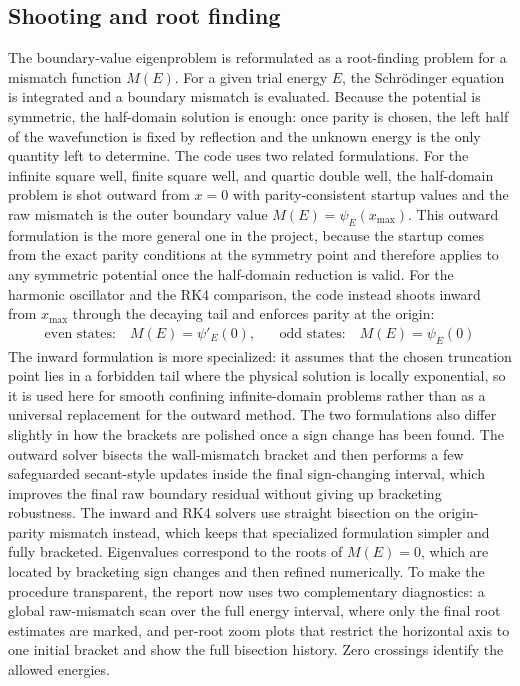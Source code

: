 \documentclass[11pt]{article}
\begin{document}
\begin{refsection}
        \subsection{Shooting and root finding}
            The boundary-value eigenproblem is reformulated as a root-finding problem for a mismatch function $M(E)$. For a given trial energy $E$, the Schr\"odinger equation is integrated and a boundary mismatch is evaluated. Because the potential is symmetric, the half-domain solution is enough: once parity is chosen, the left half of the wavefunction is fixed by reflection and the unknown energy is the only quantity left to determine. The code uses two related formulations. For the infinite square well, finite square well, and quartic double well, the half-domain problem is shot outward from $x=0$ with parity-consistent startup values and the raw mismatch is the outer boundary value $M(E)=\psi_E(x_{\max})$. This outward formulation is the more general one in the project, because the startup comes from the exact parity conditions at the symmetry point and therefore applies to any symmetric potential once the half-domain reduction is valid. For the harmonic oscillator and the RK4 comparison, the code instead shoots inward from $x_{\max}$ through the decaying tail and enforces parity at the origin:
            \begin{align}
            \text{even states:}\quad M(E) = \psi'_E(0),\,\,\,\,\,\,\,\,\,\,\text{odd states:}\quad M(E) = \psi_E(0)
            \end{align}
            The inward formulation is more specialized: it assumes that the chosen truncation point lies in a forbidden tail where the physical solution is locally exponential, so it is used here for smooth confining infinite-domain problems rather than as a universal replacement for the outward method. The two formulations also differ slightly in how the brackets are polished once a sign change has been found. The outward solver bisects the wall-mismatch bracket and then performs a few safeguarded secant-style updates inside the final sign-changing interval, which improves the final raw boundary residual without giving up bracketing robustness. The inward and RK4 solvers use straight bisection on the origin-parity mismatch instead, which keeps that specialized formulation simpler and fully bracketed. Eigenvalues correspond to the roots of $M(E)=0$, which are located by bracketing sign changes and then refined numerically. To make the procedure transparent, the report now uses two complementary diagnostics: a global raw-mismatch scan over the full energy interval, where only the final root estimates are marked, and per-root zoom plots that restrict the horizontal axis to one initial bracket and show the full bisection history. Zero crossings identify the allowed energies. \\


\end{refsection}
\end{document}
